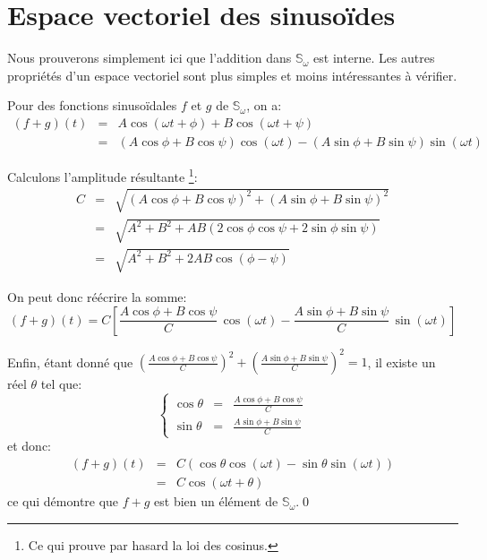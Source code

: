 \section{Espace vectoriel des sinusoïdes}
\label{sec:math/espace-vect-sinus}

Nous prouverons simplement ici que l'addition dans $\mathbb{S}_\omega$
est interne.
Les autres propriétés d'un espace vectoriel sont plus simples
et moins intéressantes à vérifier.

Pour des fonctions sinusoïdales $f$ et $g$ de $\mathbb{S}_\omega$, on a:
\[
    \begin{array}{rcl}
        (f+g)(t) &=& A\cos(\omega t + \phi) + B\cos(\omega t + \psi) \\
                 &=& (A\cos\phi+B\cos\psi)\cos(\omega t)
                     - (A\sin\phi+B\sin\psi)\sin(\omega t)
    \end{array}
\]

Calculons l'amplitude résultante%
\footnote{
    Ce qui prouve par hasard la loi des cosinus.
}:
\[
    \begin{array}{rcl}
        C &=& \sqrt{(A\cos\phi+B\cos\psi)^2+(A\sin\phi+B\sin\psi)^2} \\
          &=& \sqrt{A^2+B^2+AB(2\cos\phi\cos\psi+2\sin\phi\sin\psi)} \\
          &=& \sqrt{A^2+B^2+2AB\cos(\phi-\psi)}
    \end{array}
\]

On peut donc réécrire la somme:
\[
    (f+g)(t) = C\left[ \frac{A\cos\phi+B\cos\psi}{C}\, \cos(\omega t)
                     - \frac{A\sin\phi+B\sin\psi}{C}\, \sin(\omega t) \right]
\]

Enfin, étant donné que $\left( \frac{A\cos\phi+B\cos\psi}{C} \right)^2
+ \left( \frac{A\sin\phi+B\sin\psi}{C} \right)^2 = 1$,
il existe un réel $\theta$ tel que:
\[
    \left\{
    \begin{array}{rcl}
        \cos\theta &=& \frac{A\cos\phi+B\cos\psi}{C} \\
        \sin\theta &=& \frac{A\sin\phi+B\sin\psi}{C}
    \end{array}
    \right.
\]
et donc:
\[
    \begin{array}{rcl}
        (f+g)(t) &=& C ( \cos\theta\cos(\omega t)
                       - \sin\theta\sin(\omega t) ) \\
                 &=& C\cos(\omega t + \theta)
    \end{array}
\]
ce qui démontre que $f+g$ est bien un élément de $\mathbb{S}_\omega$.\qed
